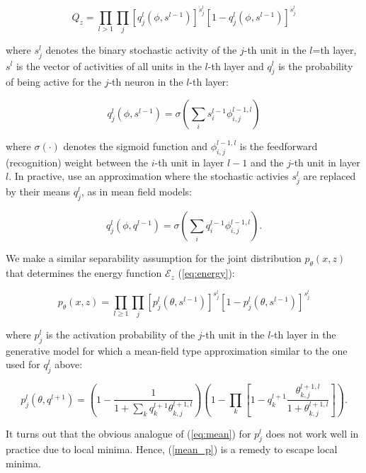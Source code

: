 \documentclass[11pt]{article}
\def\E{\mathcal{E}}
\begin{document}
\begin{equation}
Q_z = \prod_{l>1} \prod_{j} [q_j^l(\phi,s^{l-1})]^{s_j^l} [1-q_j^l (\phi,s^{l-1})]^{s_j^l}
\end{equation}

where $s_j^l$ denotes the binary stochastic activity of the $j$-th unit in the $l$=th layer, $s^l$ is the vector of activities of all units in the $l$-th layer and $q_j^l$ is the probability of being active for the $j$-th neuron in the $l$-th layer:

\begin{equation}
q_j^l(\phi,s^{l-1}) = \sigma\left(\sum_i s_i^{l-1} \phi_{i,j}^{l-1,l} \right)
\end{equation}

where $\sigma(\cdot)$ denotes the sigmoid function and $\phi_{i,j}^{l-1,l}$ is the feedforward (recognition) weight between the $i$-th unit in layer $l-1$ and the $j$-th unit in layer $l$. In practive, \cite{DayanHintonNealEtAl95} use an approximation where the stochastic activies $s_j^l$ are replaced by their means $q_j^l$, as in mean field models:

\begin{equation}
q_j^l(\phi, q^{l-1}) = \sigma\left( \sum_i q_i^{l-1} \phi_{i,j}^{l-1,l} \right).
\label{eq:mean}
\end{equation}

We make a similar separability assumption for the joint distribution $p_\theta(x,z)$ that determines the energy function $\E_z$ (\ref{eq:energy}):

\begin{equation}
p_\theta(x,z) = \prod_{l\geq 1}\prod_j [ p_j^l(\theta,s^{l-1}) ]^{s_j^l} [1-p_j^l(\theta,s^{l-1})]^{s_j^l}
\end{equation}

where $p_j^l$ is the activation probability of the $j$-th unit in the $l$-th layer in the generative model for which a mean-field type approximation similar to the one used for $q_j^l$ above:

\begin{equation}
p_j^l(\theta,q^{l+1}) = \left(1-\frac{1}{1+\sum_k q_k^{l+1} \theta_{k,j}^{l+1,l}} \right) \left( 1-\prod_k \left[ 1 - q_k^{l+1} \frac{\theta_{k,j}^{l+1,l}}{1+\theta_{k,j}^{l+1,l}} \right] \right).
\label{eq:mean_p}
\end{equation}

It turns out that the obvious analogue of (\ref{eq:mean}) for $p_j^l$ does not work well in practice due to local minima. Hence, (\ref{mean_p}) is a remedy to escape local minima.
\end{document}
